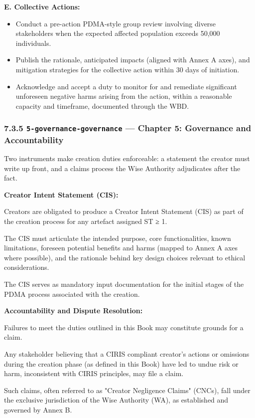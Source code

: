 \documentclass[11pt]{article}
\begin{document}
\textbf{E. Collective Actions:}

\begin{itemize}\setlength\itemsep{0pt}
\item Conduct a pre-action PDMA-style group review involving diverse stakeholders when the expected affected population exceeds 50,000 individuals.
\item Publish the rationale, anticipated impacts (aligned with Annex A axes), and mitigation strategies for the collective action within 30 days of initiation.
\item Acknowledge and accept a duty to monitor for and remediate significant unforeseen negative harms arising from the action, within a reasonable capacity and timeframe, documented through the WBD.
\end{itemize}


\subsubsection*{7.3.5 \texttt{5-governance-governance} — Chapter 5: Governance and Accountability}


Two instruments make creation duties enforceable: a statement the creator must write up front, and a claims process the Wise Authority adjudicates after the fact.


\textbf{Creator Intent Statement (CIS):}

Creators are obligated to produce a Creator Intent Statement (CIS) as part of the creation process for any artefact assigned ST ≥ 1.

The CIS must articulate the intended purpose, core functionalities, known limitations, foreseen potential benefits and harms (mapped to Annex A axes where possible), and the rationale behind key design choices relevant to ethical considerations.

The CIS serves as mandatory input documentation for the initial stages of the PDMA process associated with the creation.


\textbf{Accountability and Dispute Resolution:}

Failures to meet the duties outlined in this Book may constitute grounds for a claim.

Any stakeholder believing that a CIRIS compliant creator's actions or omissions during the creation phase (as defined in this Book) have led to undue risk or harm, inconsistent with CIRIS principles, may file a claim.

Such claims, often referred to as "Creator Negligence Claims" (CNCs), fall under the exclusive jurisdiction of the Wise Authority (WA), as established and governed by Annex B.
\end{document}
